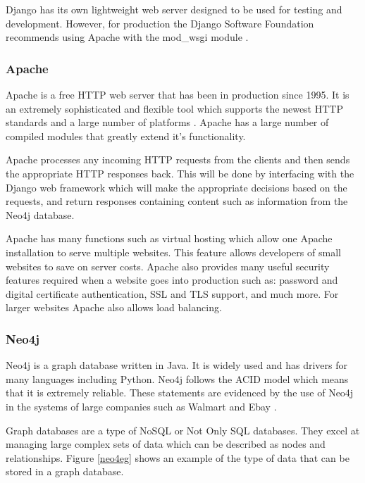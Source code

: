 \documentclass[12pt,onecolumn]{article}
\begin{document}
	Django has its own lightweight web server designed to be used for testing and development. However, for production the Django Software Foundation recommends using Apache with the mod\_wsgi module \cite{djangoApache}.
	\subsubsection{Apache}
	
	Apache is a free HTTP web server that has been in production since 1995. It is an extremely sophisticated and flexible tool which supports the newest HTTP standards and a large number of platforms \cite{apache}. Apache has a large number of compiled modules that greatly extend it's functionality. 
	
	
	Apache processes any incoming HTTP requests from the clients and then sends the appropriate HTTP responses back. This will be done by interfacing with the Django web framework which will make the appropriate decisions based on the requests, and return responses containing content such as information from the Neo4j database. 
	
	Apache has many functions such as virtual hosting which allow one Apache installation to serve multiple websites. This feature allows developers of small websites to save on server costs. Apache also provides many useful security features required when a website goes into production such as: password and digital certificate authentication, SSL and TLS support, and much more. For larger websites Apache also allows load balancing. 
	
	\subsubsection{Neo4j}
	Neo4j is a graph database written in Java. It is widely used and has drivers for many languages including Python. Neo4j follows the ACID model which means that it is extremely reliable. These statements are evidenced by the use of Neo4j in the systems of large companies such as Walmart and Ebay \cite{neo4j}.  
	
	Graph databases are a type of NoSQL or Not Only SQL databases. They excel at managing large complex sets of data which can be described as nodes and relationships. Figure \ref{neo4eg} shows an example of the type of data that can be stored in a graph database.
	
\end{document}
